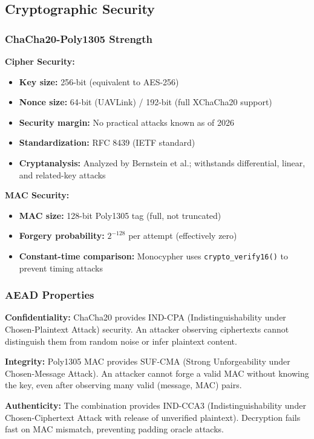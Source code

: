 \documentclass[11pt,a4paper]{article}
\begin{document}
\subsection{Cryptographic Security}

\subsubsection{ChaCha20-Poly1305 Strength}

\textbf{Cipher Security:}
\begin{itemize}[noitemsep]
    \item \textbf{Key size:} 256-bit (equivalent to AES-256)
    \item \textbf{Nonce size:} 64-bit (UAVLink) / 192-bit (full XChaCha20 support)
    \item \textbf{Security margin:} No practical attacks known as of 2026
    \item \textbf{Standardization:} RFC 8439 (IETF standard)
    \item \textbf{Cryptanalysis:} Analyzed by Bernstein et al.; withstands differential, linear, and related-key attacks
\end{itemize}

\textbf{MAC Security:}
\begin{itemize}[noitemsep]
    \item \textbf{MAC size:} 128-bit Poly1305 tag (full, not truncated)
    \item \textbf{Forgery probability:} $2^{-128}$ per attempt (effectively zero)
    \item \textbf{Constant-time comparison:} Monocypher uses \texttt{crypto\_verify16()} to prevent timing attacks
\end{itemize}

\subsubsection{AEAD Properties}

\textbf{Confidentiality:} ChaCha20 provides IND-CPA (Indistinguishability under Chosen-Plaintext Attack) security. An attacker observing ciphertexts cannot distinguish them from random noise or infer plaintext content.

\textbf{Integrity:} Poly1305 MAC provides SUF-CMA (Strong Unforgeability under Chosen-Message Attack). An attacker cannot forge a valid MAC without knowing the key, even after observing many valid (message, MAC) pairs.

\textbf{Authenticity:} The combination provides IND-CCA3 (Indistinguishability under Chosen-Ciphertext Attack with release of unverified plaintext). Decryption fails fast on MAC mismatch, preventing padding oracle attacks.
\end{document}
